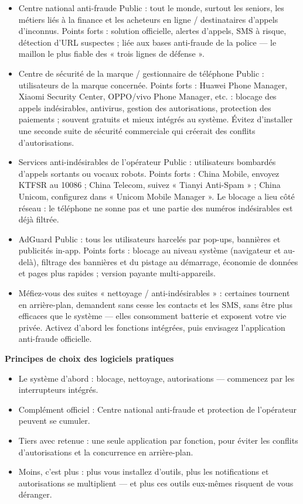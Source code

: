 \begin{itemize}
  \item Centre national anti-fraude Public : tout le monde, surtout les seniors, les métiers liés à la finance et les acheteurs en ligne / destinataires d'appels d'inconnus. Points forts : solution officielle, alertes d'appels, SMS à risque, détection d'URL suspectes ; liée aux bases anti-fraude de la police — le maillon le plus fiable des « trois lignes de défense ».
  \item Centre de sécurité de la marque / gestionnaire de téléphone Public : utilisateurs de la marque concernée. Points forts : Huawei Phone Manager, Xiaomi Security Center, OPPO/vivo Phone Manager, etc. : blocage des appels indésirables, antivirus, gestion des autorisations, protection des paiements ; souvent gratuits et mieux intégrés au système. Évitez d'installer une seconde suite de sécurité commerciale qui créerait des conflits d'autorisations.
  \item Services anti-indésirables de l'opérateur Public : utilisateurs bombardés d'appels sortants ou vocaux robots. Points forts : China Mobile, envoyez KTFSR au 10086 ; China Telecom, suivez « Tianyi Anti-Spam » ; China Unicom, configurez dans « Unicom Mobile Manager ». Le blocage a lieu côté réseau : le téléphone ne sonne pas et une partie des numéros indésirables est déjà filtrée.
  \item AdGuard Public : tous les utilisateurs harcelés par pop-ups, bannières et publicités in-app. Points forts : blocage au niveau système (navigateur et au-delà), filtrage des bannières et du pistage au démarrage, économie de données et pages plus rapides ; version payante multi-appareils.
  \item Méfiez-vous des suites « nettoyage / anti-indésirables » : certaines tournent en arrière-plan, demandent sans cesse les contacts et les SMS, sans être plus efficaces que le système — elles consomment batterie et exposent votre vie privée. Activez d'abord les fonctions intégrées, puis envisagez l'application anti-fraude officielle.
\end{itemize}

\textbf{Principes de choix des logiciels pratiques}\par

\begin{itemize}
  \item Le système d'abord : blocage, nettoyage, autorisations — commencez par les interrupteurs intégrés.
  \item Complément officiel : Centre national anti-fraude et protection de l'opérateur peuvent se cumuler.
  \item Tiers avec retenue : une seule application par fonction, pour éviter les conflits d'autorisations et la concurrence en arrière-plan.
  \item Moins, c'est plus : plus vous installez d'outils, plus les notifications et autorisations se multiplient — et plus ces outils eux-mêmes risquent de vous déranger.
\end{itemize}

